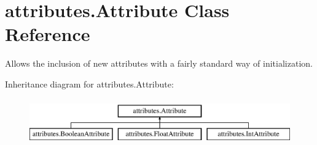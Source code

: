 \hypertarget{classattributes_1_1_attribute}{\section{attributes.\-Attribute Class Reference}
\label{classattributes_1_1_attribute}
}


Allows the inclusion of new attributes with a fairly standard way of initialization.  


Inheritance diagram for attributes.\-Attribute\-:\begin{figure}[H]
\begin{center}
\leavevmode
\includegraphics[height=2.000000cm]{classattributes_1_1_attribute}
\end{center}
\end{figure}

